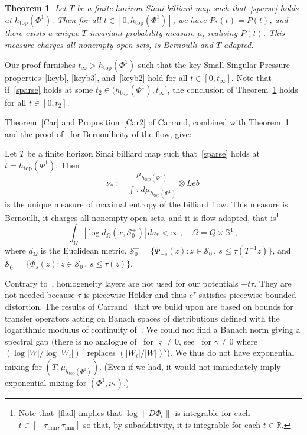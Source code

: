 \documentclass[10pt]{amsart}
\newtheorem{theo}{Theorem}[section]
\theoremstyle{definition}\newtheorem{defi}[theo]{Definition}\newtheorem{rema}[theo]{Remark}\newtheorem{exam}[theo]{Example}\newtheorem{exem}[theo]{Example}\newtheorem{nota}[theo]{Notation}
\newcommand{\cS}{\mathcal{S}}
\newcommand{\bbR}{\mathbb{R}}
\newcommand{\bbS}{\mathbb{S}}
\newcommand{\htop}{h_{\scriptstyle{\text{top}}}}
\begin{document}
\begin{theo}\label{main}
Let $T$ be a finite horizon Sinai billiard map such that~\eqref{sparse} holds at $\htop(\Phi^1)$. Then for all $t\in[0, \htop(\Phi^1)]$, we have $P_*(t)=P(t)$, and there exists a unique $T$-invariant probability measure $\mu_t$ realising $P(t)$. This measure charges all nonempty open sets, is Bernoulli and $T$-adapted.
\end{theo}


Our proof furnishes $t_\infty> \htop(\Phi^1) $ such that the key Small Singular Pressure properties~\eqref{keyb}, \eqref{keyb3}, and~\eqref{keyb2} hold for all $t\in[0, t_\infty]$. Note that if~\eqref{sparse} holds at some $t_2\in (\htop(\Phi^1), t_\infty]$, the conclusion of Theorem~\ref{main} holds for all $t\in [0,t_2]$.

Theorem~\ref{Car} and Proposition~\ref{Car2} of Carrand, combined with Theorem~\ref{main} and the proof of~\cite[Propositions~7.1 and~7.2]{Ca} for Bernoullicity of the flow, give:



\begin{coro}\label{cormain}
Let $T$ be a finite horizon Sinai billiard map such that~\eqref{sparse} holds at $t=\htop(\Phi^1)$. Then
\[
\nu_*:=\frac{\mu_{\htop(\Phi^1)}}{\int \tau \, d \mu_{\htop(\Phi^1)}} \otimes Leb\,
\]
is the unique measure of maximal entropy of the billiard flow. This measure is Bernoulli, it charges all nonempty open sets, and it is flow adapted, that is\footnote{Note that~\eqref{flad} implies that $\log \| D\Phi_t \|$ is integrable for each $t \in [-\tau_{\min}, \tau_{\min}]$ so that, by subadditivity, it is integrable for each $t \in \bbR$.}
\begin{equation}\label{flad}
\int_\Omega \left|\log d_\Omega(x, \cS_0^\pm)\right| \, d\nu_{*} <\infty\,,\quad
\Omega = Q \times \bbS^1
\,,
\end{equation}
where $d_\Omega$ is the Euclidean metric, $
\cS_0^- = \{ \Phi_{-s}(z) : z \in \cS_0 \,,\, s \le \tau(T^{-1}z) \}$, and $ \cS_0^+ = \{ \Phi_s(z) : z \in \cS_0 \,,\, s \le \tau(z) \}$.
\end{coro}




Contrary to~\cite{BD2}, homogeneity layers are not used for our potentials $-t\tau$. They are not needed because $\tau$ is piecewise H\"older and thus $e^\tau$ satisfies piecewise bounded distortion. The results of Carrand~\cite{Ca} that we build upon are based on bounds for transfer operators acting on Banach spaces of distributions defined with the logarithmic modulus of continuity of~\cite{BD1}. We could not find a Banach norm giving a spectral gap (there is no analogue of~\cite[Lemmas~3.3 and~3.4]{BD2} for $\varsigma\ne 0$, see~\cite[Lemma~3.1]{Ca} for $\gamma\ne 0$ where $(\log |W|/\log|W_i|)^\gamma$ replaces $(|W_i|/|W|)^\varsigma$). We thus do not have exponential mixing for $(T,\mu_{\htop(\Phi^1)})$. (Even if we had, it would not immediately imply exponential mixing for $(\Phi^1,\nu_*)$.)
\end{document}
